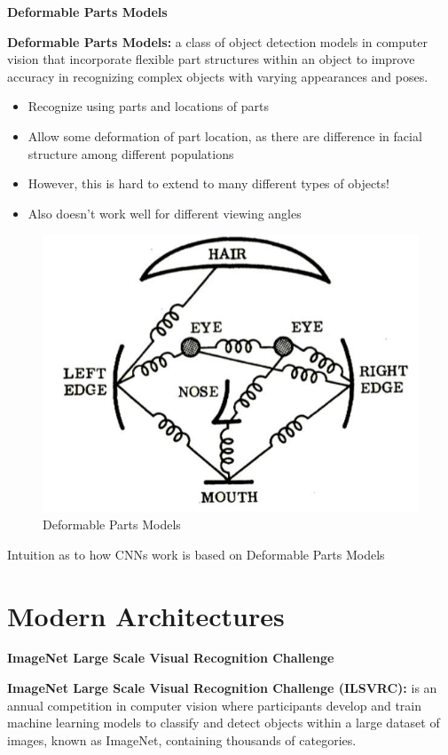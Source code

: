 \textbf{Deformable Parts Models}

\begin{definition}
    \textbf{Deformable Parts Models:} a class of object detection models in computer vision that incorporate flexible part structures within an object to improve accuracy in recognizing complex objects with varying appearances and poses.
\end{definition}

\begin{itemize}
    \item Recognize using parts and locations of parts
    \item Allow some deformation of part location, as there are difference in facial structure among different populations
    \item However, this is hard to extend to many different types of objects!
    \item Also doesn't work well for different viewing angles
\end{itemize}

\begin{figure}[h!t]
    \centering
    \includegraphics[width=0.35\linewidth]{dpm.png}
    \caption{Deformable Parts Models}
    \label{fig:enter-label}
\end{figure}

\begin{idea}
    Intuition as to how CNNs work is based on Deformable Parts Models
\end{idea}

\section{Modern Architectures}

\textbf{ImageNet Large Scale Visual Recognition Challenge}

\begin{definition}
   \textbf{ImageNet Large Scale Visual Recognition Challenge (ILSVRC):} is an annual competition in computer vision where participants develop and train machine learning models to classify and detect objects within a large dataset of images, known as ImageNet, containing thousands of categories.
\end{definition}

